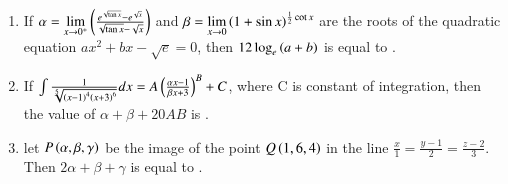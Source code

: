 \documentclass[journal]{IEEEtran}
\begin{document}
\begin{enumerate}[start=16]
\item %
If $\alpha = \lim\limits_{x \to 0^+} \left(\frac{e^{\sqrt{\tan{x}}} - e^{\sqrt{x}}}{\sqrt{\tan{x}}-\sqrt{x}}\right)$ and $\beta = \lim\limits_{x \to 0}\left(1+\sin{x}\right)^{\frac{1}{2}\cot{x}}$ are the roots of the quadratic equation $ax^2+bx-\sqrt{e} = 0$, then $12 \log_e \left(a+b\right)$ is equal to \underline{\hspace{1cm}}. 
\item %
If $  \int \frac{1}{\sqrt[5]{\left(x-1\right)^4\left(x+3\right)^6}} dx = A\left(\frac{\alpha x -1}{\beta x + 3}\right)^B + C$, where C is constant of integration, then the value of $\alpha + \beta +20AB$ is \underline{\hspace{1cm}}.
\item %
let $P\left(\alpha , \beta , \gamma \right)$ be the image of the point $Q\left(1 , 6, 4\right)$ in the line $\frac{x}{1} = \frac{y-1}{2} = \frac{z-2}{3}$. Then $2\alpha +\beta +\gamma$ is equal to \underline{\hspace{1cm}}.
\end{enumerate}
\end{document}
